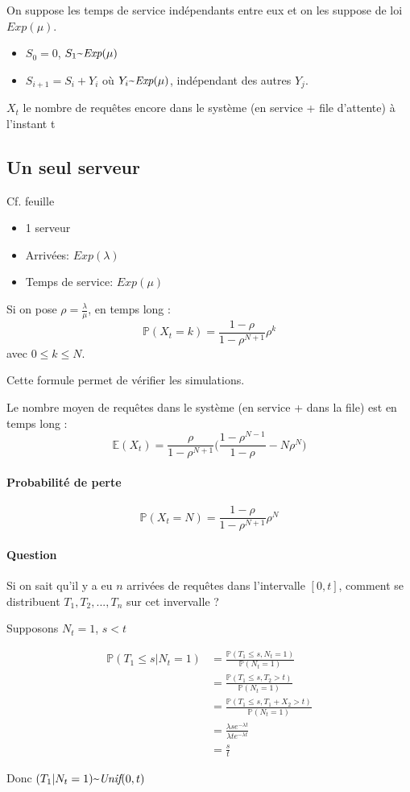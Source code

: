 \documentclass{article}
\newcommand{\textapprox}{\raisebox{0.5ex}{\texttildelow}}
\begin{document}
On suppose les temps de service indépendants entre eux et on les suppose de loi $\textit{Exp}(\mu)$.

\begin{itemize}
  \item $ S_0 = 0 $, $ S_1 \textapprox \textit{Exp}(\mu) $
  \item $ S_{i+1} = S_i + Y_i$ où $Y_i \textapprox \textit{Exp}(\mu)$, indépendant des autres $Y_j$.
\end{itemize}

$X_t$ le nombre de requêtes encore dans le système (en service + file d'attente) à l'instant t

\subsection{Un seul serveur}

Cf. feuille
\begin{itemize}
  \item 1 serveur
  \item Arrivées: $\textit{Exp}(\lambda)$
  \item Temps de service: $\textit{Exp}(\mu)$
\end{itemize}

Si on pose $\rho = \frac{\lambda}{\mu}$, en temps long :
$$ \mathbb{P}(X_t = k) = \frac{1-\rho}{1-\rho^{N+1}} \rho^k $$
avec $0 \leq k \leq N$.

Cette formule permet de vérifier les simulations.

Le nombre moyen de requêtes dans le système (en service + dans la file) est en temps long :
$$ \mathbb{E}(X_t) = \frac{\rho}{1-\rho^{N+1}} \Big( \frac{1-\rho^{N-1}}{1-\rho}- N\rho^N \Big)$$

\paragraph{Probabilité de perte}
$$ \mathbb{P}(X_t = N) = \frac{1- \rho}{1-\rho^{N+1}}\rho^N $$

\paragraph{Question} Si on sait qu'il y a eu $n$ arrivées de requêtes dans l'intervalle $[0,t]$,
comment se distribuent $T_1, T_2,...,T_n$ sur cet invervalle ?

Supposons $N_t = 1$, $s < t$

\begin{align*}
  \mathbb{P}(T_1 \leq s | N_t = 1) &= \frac{\mathbb{P}(T_1 \leq s, N_t = 1)}{\mathbb{P}(N_t = 1)} \\
  &= \frac{\mathbb{P}(T_1 \leq s, T_2 > t)}{\mathbb{P}(N_t = 1)} \\
  &= \frac{\mathbb{P}(T_1 \leq s, T_1 + X_2 > t)}{\mathbb{P}(N_t = 1)} \\
  &= \frac{\lambda s e^{- \lambda t}}{\lambda t e^{- \lambda t}} \\
  &= \frac{s}{t}
\end{align*}

Donc $(T_1 | N_t = 1) \textapprox \textit{Unif}(0,t)$
\end{document}

